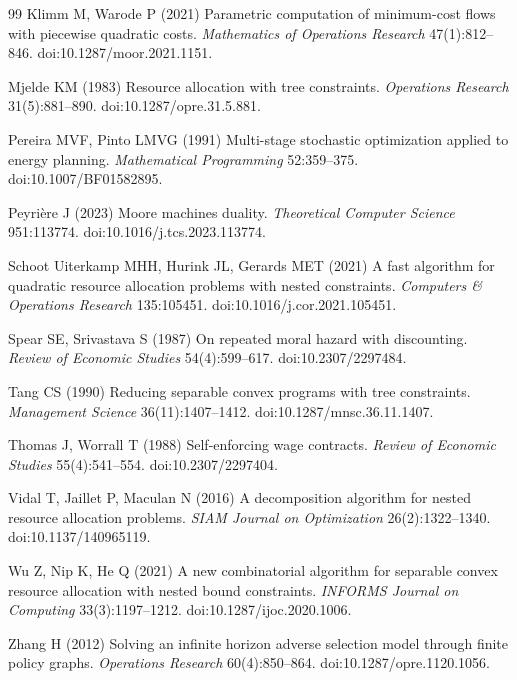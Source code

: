 \begin{thebibliography}{99}
Klimm M, Warode P (2021) Parametric computation of minimum-cost flows with piecewise quadratic costs. \emph{Mathematics of Operations Research} 47(1):812--846. doi:10.1287/moor.2021.1151.

Mjelde KM (1983) Resource allocation with tree constraints. \emph{Operations Research} 31(5):881--890. doi:10.1287/opre.31.5.881.

Pereira MVF, Pinto LMVG (1991) Multi-stage stochastic optimization applied to energy planning. \emph{Mathematical Programming} 52:359--375. doi:10.1007/BF01582895.

Peyri\`ere J (2023) Moore machines duality. \emph{Theoretical Computer Science} 951:113774. doi:10.1016/j.tcs.2023.113774.

Schoot Uiterkamp MHH, Hurink JL, Gerards MET (2021) A fast algorithm for quadratic resource allocation problems with nested constraints. \emph{Computers \& Operations Research} 135:105451. doi:10.1016/j.cor.2021.105451.

Spear SE, Srivastava S (1987) On repeated moral hazard with discounting. \emph{Review of Economic Studies} 54(4):599--617. doi:10.2307/2297484.

Tang CS (1990) Reducing separable convex programs with tree constraints. \emph{Management Science} 36(11):1407--1412. doi:10.1287/mnsc.36.11.1407.

Thomas J, Worrall T (1988) Self-enforcing wage contracts. \emph{Review of Economic Studies} 55(4):541--554. doi:10.2307/2297404.

Vidal T, Jaillet P, Maculan N (2016) A decomposition algorithm for nested resource allocation problems. \emph{SIAM Journal on Optimization} 26(2):1322--1340. doi:10.1137/140965119.

Wu Z, Nip K, He Q (2021) A new combinatorial algorithm for separable convex resource allocation with nested bound constraints. \emph{INFORMS Journal on Computing} 33(3):1197--1212. doi:10.1287/ijoc.2020.1006.

Zhang H (2012) Solving an infinite horizon adverse selection model through finite policy graphs. \emph{Operations Research} 60(4):850--864. doi:10.1287/opre.1120.1056.
\end{thebibliography}
